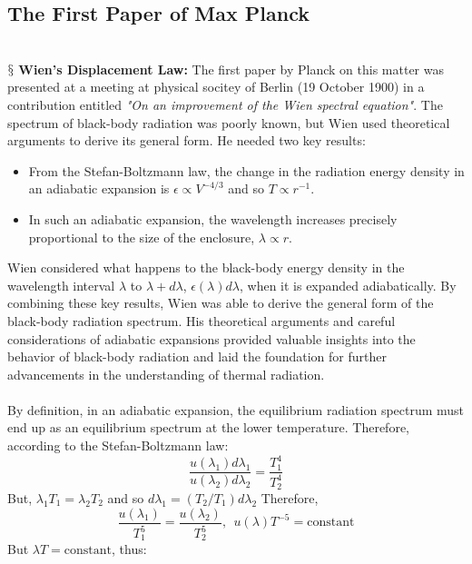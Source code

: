 \documentclass[9pt,a4paper, twocolumn]{article}
\newcounter{theo}
\newcommand{\newpoint}[1]{\ \\ \indent$\mathsection$ \textbf{#1}}
\begin{document}
        \subsection{The First Paper of Max Planck}
            \newpoint{Wien's Displacement Law:} The first paper by Planck on this matter was presented at a meeting at physical socitey of Berlin  (19 October 1900) in a contribution entitled \textit{"On an improvement of the Wien spectral equation"}. The spectrum of black-body radiation was poorly known, but Wien used theoretical arguments to derive its general form. He needed two key results:
            \begin{itemize}
            \item From the Stefan-Boltzmann law, the change in the radiation energy density in an adiabatic expansion is $\epsilon \propto V^{-4/3}$ and so $T \propto r^{-1}$.
            \item In such an adiabatic expansion, the wavelength increases precisely proportional to the size of the enclosure, $\lambda \propto r$.
            \end{itemize}
            Wien considered what happens to the black-body energy density in the wavelength interval $\lambda$ to $\lambda + d\lambda$, $\epsilon(\lambda)d\lambda$, when it is expanded adiabatically. By combining these key results, Wien was able to derive the general form of the black-body radiation spectrum. His theoretical arguments and careful considerations of adiabatic expansions provided valuable insights into the behavior of black-body radiation and laid the foundation for further advancements in the understanding of thermal radiation.
            \\
            \\
            By definition, in an adiabatic expansion, the equilibrium radiation spectrum must end up as an equilibrium spectrum at the lower temperature. Therefore, according to the Stefan-Boltzmann law:
            \begin{equation}
                \frac{u(\lambda_1)d\lambda_1}{u(\lambda_2)d\lambda_2} = \frac{T_1^4}{T_2^4}
            \end{equation}
            But, $\lambda_1T_1 = \lambda_2T_2$ and so $d\lambda_1 =(T_2/T_1)d\lambda_2$ Therefore, 
            \begin{equation}
                \frac{u(\lambda_1)}{T_1^5} = \frac{u(\lambda_2)}{T_2^5} ,  \ \ u(\lambda) T^{-5} = \text{constant}
            \end{equation}
            But $\lambda T = \text{constant}$, thus:
\end{document}
